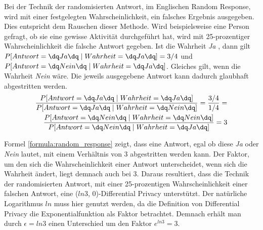 Bei der Technik der randomisierten Antwort, im Englischen Random Response, wird mit einer festgelegten Wahrscheinlichkeit, ein falsches Ergebnis ausgegeben. 
Dies entspricht dem Rauschen dieser Methode.
Wird beispielsweise eine Person gefragt, ob sie eine gewisse Aktivität durchgeführt hat, wird mit 25-prozentiger Wahrscheinlichkeit die falsche Antwort gegeben.
Ist die Wahrheit \textit{\dq Ja \dq}, dann gilt $P[Antwort = \dq Ja\dq \mid Wahrheit = \dq Ja\dq] = 3/4$ und $P[Antwort = \dq Nein\dq \mid Wahrheit = \dq Ja\dq]$.
Gleiches gilt, wenn die Wahrheit \textit{\dq Nein \dq} wäre.
Die jeweils ausgegebene Antwort kann dadurch glaubhaft abgestritten werden.
\begin{equation} \label{formula:random_response}
\begin{split}
\frac{P[Antwort = \dq Ja\dq \mid Wahrheit = \dq Ja\dq]}{P[Antwort = \dq Ja\dq \mid Wahrheit = \dq Nein\dq]} = \frac{3/4}{1/4} = \\
\frac{P[Antwort = \dq Nein\dq \mid Wahrheit = \dq Nein\dq]}{P[Antwort = \dq Nein\dq \mid Wahrheit = \dq Ja\dq]} =  3
\end{split}
\end{equation}

Formel \ref{formula:random_response} zeigt, dass eine Antwort, egal ob diese \textit{\dq Ja \dq} oder \textit{\dq Nein \dq} lautet, mit einem Verhältnis von 3 abgestritten werden kann.
Der Faktor, um den sich die Wahrscheinlichkeit einer Antwort unterscheidet, wenn sich die Wahrheit ändert, liegt demnach auch bei 3.
Daraus resultiert, dass die Technik der randomisierten Antwort, mit einer 25-prozentigen Wahrscheinlichkeit einer falschen Antwort, eine ($ln 3$, 0)-Differential Privacy unterstützt.
Der natürliche Logarithmus $ln$ muss hier genutzt werden, da die Definition von Differential Privacy die Exponentialfunktion als Faktor betrachtet. 
Demnach erhält man durch $\epsilon = ln 3$ einen Unterschied um den Faktor $e^{ln 3} = 3$.

